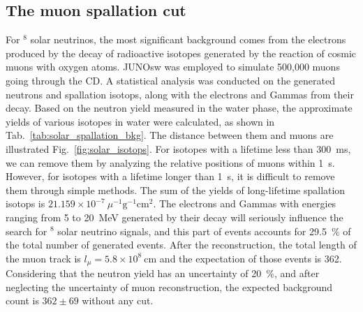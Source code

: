 \subsection{The muon spallation cut}
For $^8$ solar neutrinos, the most significant background comes from the electrons produced by the decay of radioactive isotopes generated by the reaction of cosmic muons with oxygen atoms. JUNOsw was employed to simulate 500,000 muons going through the CD. A statistical analysis was conducted on the generated neutrons and spallation isotops, along with the electrons and Gammas from their decay. Based on the neutron yield measured in the water phase, the approximate yields of various isotopes in water were calculated, as shown in Tab.~\ref{tab:solar_spallation_bkg}. The distance between them and muons are illustrated Fig.~\ref{fig:solar_isotops}.
For isotopes with a lifetime less than \SI{300}{ms}, we can remove them by analyzing the relative positions of muons within \SI{1}{s}. However, for isotopes with a lifetime longer than \SI{1}{s}, it is difficult to remove them through simple methods. The sum of the yields of long-lifetime spallation isotops is $21.159\times 10^{-7}~\mu^{-1}\mathrm{g}^{-1}\mathrm{cm}^{2}$. The electrons and Gammas with energies ranging from 5 to \SI{20}{MeV} generated by their decay will seriously influence the search for $^8$ solar neutrino signals, and this part of events accounts for \SI{29.5}{\%} of the total number of generated events. After the reconstruction, the total length of the muon track is $l_{\mu}=5.8\times10^8~\text{cm}$ and the expectation of those events is 362. Considering that the neutron yield has an uncertainty of \SI{20}{\%}, and after neglecting the uncertainty of muon reconstruction, the expected background count is $362\pm69$ without any cut.

